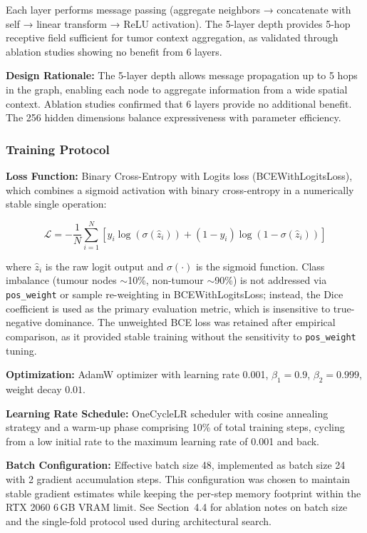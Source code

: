 \documentclass{article}
\begin{document}
Each layer performs message passing (aggregate neighbors → concatenate with self → linear transform → ReLU activation). The 5-layer depth provides 5-hop receptive field sufficient for tumor context aggregation, as validated through ablation studies showing no benefit from 6 layers.

\textbf{Design Rationale:} The 5-layer depth allows message propagation up to 5 hops in the graph, enabling each node to aggregate information from a wide spatial context. Ablation studies confirmed that 6 layers provide no additional benefit. The 256 hidden dimensions balance expressiveness with parameter efficiency.

\subsubsection{Training Protocol}

\textbf{Loss Function:} Binary Cross-Entropy with Logits loss (BCEWithLogitsLoss), which combines a sigmoid activation with binary cross-entropy in a numerically stable single operation:

\begin{equation}
\mathcal{L} = -\frac{1}{N} \sum_{i=1}^{N} \left[ y_i \log(\sigma(\hat{z}_i)) + (1-y_i) \log(1-\sigma(\hat{z}_i)) \right]
\end{equation}

where $\hat{z}_i$ is the raw logit output and $\sigma(\cdot)$ is the sigmoid function. Class imbalance (tumour nodes $\sim$10\%, non-tumour $\sim$90\%) is not addressed via \texttt{pos\_weight} or sample re-weighting in BCEWithLogitsLoss; instead, the Dice coefficient is used as the primary evaluation metric, which is insensitive to true-negative dominance. The unweighted BCE loss was retained after empirical comparison, as it provided stable training without the sensitivity to \texttt{pos\_weight} tuning.

\textbf{Optimization:} AdamW \cite{loshchilov2019adamw} optimizer with learning rate 0.001, $\beta_1=0.9$, $\beta_2=0.999$, weight decay $0.01$.

\textbf{Learning Rate Schedule:} OneCycleLR scheduler with cosine annealing strategy and a warm-up phase comprising 10\% of total training steps, cycling from a low initial rate to the maximum learning rate of 0.001 and back.

\textbf{Batch Configuration:} Effective batch size 48, implemented as batch size 24 with 2 gradient accumulation steps. This configuration was chosen to maintain stable gradient estimates while keeping the per-step memory footprint within the RTX 2060 6\,GB VRAM limit. See Section~4.4 for ablation notes on batch size and the single-fold protocol used during architectural search.
\end{document}
